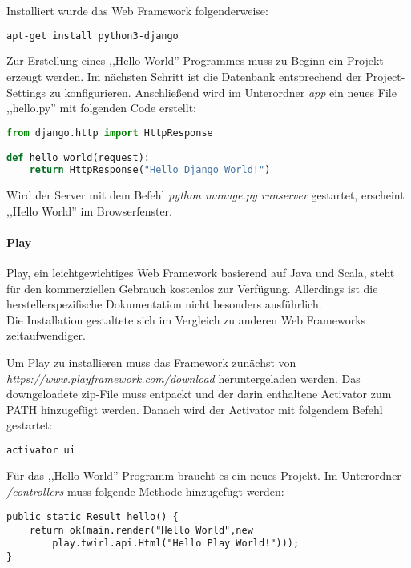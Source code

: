 Installiert wurde das Web Framework folgenderweise:
\begin{lstlisting}[caption={Installation von Django\cite{DJANGOIN}}, language=bash]
apt-get install python3-django
\end{lstlisting}

Zur Erstellung eines ,,Hello-World''-Programmes muss zu Beginn ein Projekt erzeugt werden. Im nächsten Schritt ist die Datenbank entsprechend der Project-Settings zu konfigurieren. Anschließend wird im Unterordner \textit{app} ein neues File ,,hello.py'' mit folgenden Code erstellt:

\begin{lstlisting}[caption={Django Hello-World \cite{DJANGOCODE}}, language=Python]
from django.http import HttpResponse

def hello_world(request):
	return HttpResponse("Hello Django World!")
\end{lstlisting}

Wird der Server mit dem Befehl \textit{python manage.py runserver} gestartet, erscheint ,,Hello World'' im Browserfenster.

\paragraph{Play}
Play, ein leichtgewichtiges Web Framework basierend auf Java und Scala, steht für den kommerziellen Gebrauch kostenlos zur Verfügung. Allerdings ist die herstellerspezifische Dokumentation nicht besonders ausführlich.\\
Die Installation gestaltete sich im Vergleich zu anderen Web Frameworks zeitaufwendiger. \cite{PLAY}

\newpage

Um Play zu installieren muss das Framework zunächst von
\textit{https://www.playframework.com/download} heruntergeladen werden. Das downgeloadete zip-File muss entpackt und der darin enthaltene Activator zum PATH hinzugefügt werden. Danach wird der Activator mit folgendem Befehl gestartet\cite{PLAYCON}:
\begin{lstlisting}[caption={Konifiguration von Play \cite{PLAYCON}}, language=bash]
activator ui
\end{lstlisting}

Für das ,,Hello-World''-Programm braucht es ein neues Projekt. Im Unterordner \textit{/controllers} muss folgende Methode hinzugefügt werden:

\begin{lstlisting}[caption={Play Hello-World \cite{PLAYCON}}]
public static Result hello() {
	return ok(main.render("Hello World",new
		play.twirl.api.Html("Hello Play World!")));
}
\end{lstlisting}

